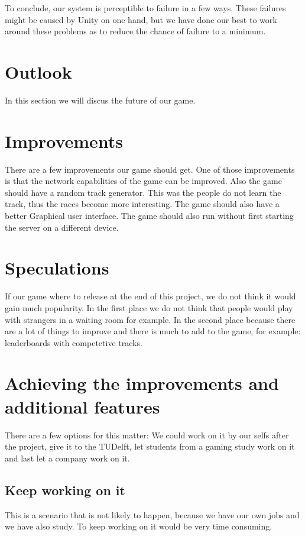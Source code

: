 \documentclass[11pt,twoside,a4paper]{article}
\begin{document}
\newline
\newline
To conclude, our system is perceptible to failure in a few ways. These failures might be caused by Unity on one hand, but we have done our best to work around these problems as to reduce the chance of failure to a minimum.

\newpage

\section{Outlook}
In this section we will discus the future of our game.

\section{Improvements}
There are a few improvements our game should get. One of those improvements is that the network capabilities of the game can be improved. Also the game should have a random track generator. This was the people do not learn the track, thus the races become more interesting. The game should also have a better Graphical user interface. The game should also run without first starting the server on a different device.

\section{Speculations}
If our game where to release at the end of this project, we do not think it would gain much popularity. In the first place we do not think that people would play with strangers in a waiting room for example. In the second place because there are a lot of things to improve and there is much to add to the game, for example: leaderboards with competetive tracks. 

\section{Achieving the improvements and additional features}
There are a few options for this matter: We could work on it by our selfs after the project, give it to the TUDelft, let students from a gaming study work on it and last let a company work on it.
\subsection{Keep working on it}
This is a scenario that is not likely to happen, because we have our own jobs and we have also study. To keep working on it would be very time consuming.
\end{document}
